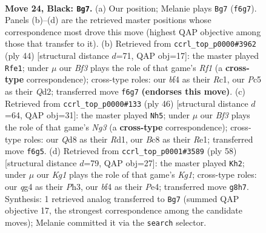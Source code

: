 \documentclass[11pt]{article}
\begin{document}
\clearpage

\begin{figure}[p]\centering
\begin{subfigure}{0.46\textwidth}\centering
\resizebox{\linewidth}{!}{%
\newchessgame
\chessboard[
  setfen={2bq1rk1/p3pp2/P2p1b2/2p2P2/2P1BBQ1/6P1/1r2N2K/R4R2 b - - 3 24},
  showmover=false,
  pgfstyle=straightmove, color=movearrow, markmove={f6-g7}
]}
\caption{}
\end{subfigure}\hfill
\begin{subfigure}{0.46\textwidth}\centering
\resizebox{\linewidth}{!}{%
\newchessgame
\chessboard[
  setfen={4r1k1/pp2qpp1/2r1b2p/3p4/5P2/1P2PB1P/P2Q2PK/2R2R2 w - - 7 23},
  showmover=false,
  pgfstyle=straightmove, color=movearrow, markmove={f1-e1}
]}
\caption{}
\end{subfigure}
\\[4pt]
\begin{subfigure}{0.46\textwidth}\centering
\resizebox{\linewidth}{!}{%
\newchessgame
\chessboard[
  setfen={r3rbk1/2q2pp1/2p1bpnB/p7/2P5/3B2NP/P1Q2PP1/3RR1K1 w - - 1 24},
  showmover=false,
  pgfstyle=straightmove, color=movearrow, markmove={g3-h5}
]}
\caption{}
\end{subfigure}\hfill
\begin{subfigure}{0.46\textwidth}\centering
\resizebox{\linewidth}{!}{%
\newchessgame
\chessboard[
  setfen={2r1r1k1/5p1p/bq4p1/1pbPp3/1p2P3/3B3P/1B2QPP1/R1R3K1 w - - 2 30},
  showmover=false,
  pgfstyle=straightmove, color=movearrow, markmove={g1-h2}
]}
\caption{}
\end{subfigure}
\caption{\textbf{Move 24, Black: \texttt{Bg7}.} (a) Our position; Melanie plays \texttt{Bg7} (\texttt{f6g7}). Panels (b)--(d) are the retrieved master positions whose correspondence most drove this move (highest QAP objective among those that transfer to it). (b) Retrieved from \texttt{ccrl\_top\_p0000\#3962} (ply 44) [structural distance $d$=71, QAP obj=17]: the master played \texttt{Rfe1}; under $\mu$ our \emph{Bf3} plays the role of that game's \emph{Rf1} (a \textbf{cross-type} correspondence); cross-type roles: our \emph{b}f4 as their \emph{R}c1, our \emph{P}c5 as their \emph{Q}d2; transferred move \texttt{f6g7} \textbf{(endorses this move)}. (c) Retrieved from \texttt{ccrl\_top\_p0000\#133} (ply 46) [structural distance $d$=64, QAP obj=31]: the master played \texttt{Nh5}; under $\mu$ our \emph{Bf3} plays the role of that game's \emph{Ng3} (a \textbf{cross-type} correspondence); cross-type roles: our \emph{Q}d8 as their \emph{R}d1, our \emph{B}c8 as their \emph{R}e1; transferred move \texttt{f6g5}. (d) Retrieved from \texttt{ccrl\_top\_p0001\#3589} (ply 58) [structural distance $d$=79, QAP obj=27]: the master played \texttt{Kh2}; under $\mu$ our \emph{Kg1} plays the role of that game's \emph{Kg1}; cross-type roles: our \emph{q}g4 as their \emph{P}h3, our \emph{b}f4 as their \emph{P}e4; transferred move \texttt{g8h7}. Synthesis: 1 retrieved analog transferred to \texttt{Bg7} (summed QAP objective 17, the strongest correspondence among the candidate moves); Melanie committed it via the \texttt{search} selector.}
\label{fig:thought-m47}
\end{figure}
\end{document}
